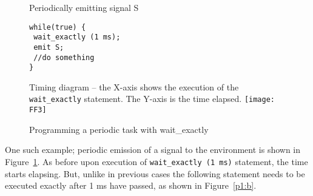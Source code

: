 \begin{figure}[t!]
  \centering
	\vspace{-10pt}
        \begin{SubFloat}{\label{pp:a}Periodically emitting signal S}
        \begin{lstlisting}[style=sysj,morekeywords={emit,trap,pause,exit,wait_exactly}]
while(true) { 
 wait_exactly (1 ms); 
 emit S; 
 //do something 
}
\end{lstlisting}
\end{SubFloat}
\begin{SubFloat}{\label{p1:b}Timing diagram -- the X-axis shows the
    execution of the \texttt{wait\_exactly} statement. The Y-axis is the
    time elapsed.}
  \texttt{[image: FF3]}
\end{SubFloat}
  \caption{Programming a periodic task with wait\_exactly}
  \label{fig:p1}
  \vspace{-10pt}
\end{figure}

One such example; periodic emission of a signal to the environment is
shown in Figure~\ref{fig:p1}. As before upon execution of
\texttt{wait\_exactly (1 ms)} statement, the time starts elapsing. But,
unlike in previous cases the following statement needs to be executed
exactly after 1 ms have passed, as shown in Figure~\ref{p1:b}.

